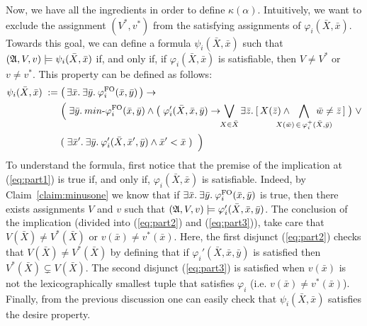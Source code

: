 Now, we have all the ingredients in order to define $\kappa(\alpha)$. 
Intuitively, we want to exclude the assignment $(V^*, v^*)$ from the satisfying assignments of $\varphi_i(\bar{X},\bar{x})$.
Towards this goal, we can define a formula $\psi_i(\bar{X},\bar{x})$ such that $(\mathfrak{A}, V, v) \models \psi_i(\bar{X},\bar{x})$ if, and only if, if $\varphi_i(\bar{X}, \bar{x})$ is satisfiable, then
$V \neq V^*$ or $v \neq v^*$. 
This property can be defined as follows:
\begin{align}
\psi_i(\bar{X},\bar{x}) \; := \;  &\big( \, \ex{\bar{x}} \ex{\bar{y}} \varphi^{\fo}_i(\bar{x},\bar{y}) \,\big) \rightarrow  \label{eq:part1} \\
&\Big( \; 
\ex{\bar{y}} \text{$min$-}\varphi^{\fo}_i(\bar{x}, \bar{y}) \wedge \big( \; \varphi_i'(\bar{X},\bar{x}, \bar{y})  \rightarrow \!\! \bigvee_{X \in \bar{X}} \ex{\bar{z}} [ \, X(\bar{z}) \wedge   \!\!\!\!\!\!\!\!\!\! \bigwedge\limits_{X(\bar{w}) \, \in \, \varphi^{+}_i(\bar{X},\bar{y})} \!\!\!\!\!\!\!\!\!\!\! \bar{w}\neq\bar{z} \, ] \; \big) \;  \vee   \label{eq:part2} \\ 
&(\; \ex{\bar{x}'} \ex{\bar{y}} \varphi_i'(\bar{X},\bar{x}',\bar{y})\wedge \bar{x}' < \bar{x} \; ) \;\; \Big)  \label{eq:part3}
\end{align}
To understand the formula, first notice that the premise of the implication at (\ref{eq:part1}) is true if, and only if, $\varphi_i(\bar{X}, \bar{x})$ is satisfiable. 
Indeed, by Claim~\ref{claim:minusone} we know that if $\exists{\bar{x}}.\: \exists{\bar{y}}.\: \varphi^{{\rm FO}}_i(\bar{x},\bar{y})$ is true, then there exists assignments $V$ and $v$ such that $(\mathfrak{A},V,v) \models\varphi_i'(\bar{X},\bar{x},\bar{y})$.
The conclusion of the implication (divided into (\ref{eq:part2}) and (\ref{eq:part3})), take care that $V(\bar{X}) \neq V^*(\bar{X})$ or $v(\bar{x}) \neq v^*(\bar{x})$.
Here, the first disjunct (\ref{eq:part2}) checks that $V(\bar{X}) \neq V^*(\bar{X})$ by defining that if $\varphi_i'(\bar{X},\bar{x}, \bar{y})$ is satisfied then $V^*(\bar{X}) \subsetneq V(\bar{X})$. 
The second disjunct (\ref{eq:part3}) is satisfied when $v(\bar{x})$ is not the lexicographically smallest tuple that satisfies $\varphi_i$ (i.e. $v(\bar{x}) \neq v^*(\bar{x})$).
Finally, from the previous discussion one can easily check that $\psi_i(\bar{X},\bar{x})$ satisfies the desire property.

